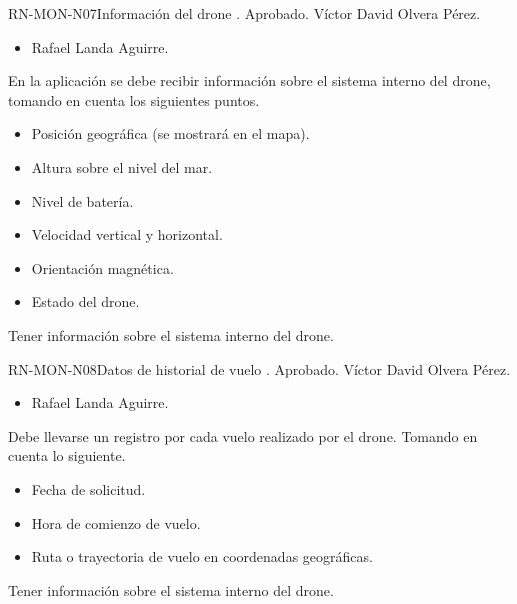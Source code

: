 %
\begin{BusinessRule}{RN-MON-N07}{Información del drone}
	{\bcIntegridad}
	{\btEnabler}
	{\blControlling}
	.
	\BRItem[Estado] Aprobado.
	 Víctor David Olvera Pérez.
	 \cdtEmpty
	\begin{itemize}
		\item Rafael Landa Aguirre.
	\end{itemize}
	\BRItem[Descripción] En la aplicación se debe recibir información sobre 
	el sistema interno del drone, tomando en cuenta los siguientes puntos.
		\begin{itemize}
			\item Posición geográfica (se mostrará en el mapa).
			\item Altura sobre el nivel del mar.
			\item Nivel de batería.
			\item Velocidad vertical y horizontal.
			\item Orientación magnética.
			\item Estado del drone.
		\end{itemize}
	\BRItem[Motivación] Tener información sobre el sistema interno del drone.
\end{BusinessRule}

%
\begin{BusinessRule}{RN-MON-N08}{Datos de historial de vuelo}
	{\bcIntegridad}
	{\btEnabler}
	{\blControlling}
	.
	\BRItem[Estado] Aprobado.
	 Víctor David Olvera Pérez.
	 \cdtEmpty
	\begin{itemize}
		\item Rafael Landa Aguirre.
	\end{itemize}
	\BRItem[Descripción] Debe llevarse un registro por cada vuelo realizado 
	por el drone. Tomando en cuenta lo siguiente.
	\begin{itemize}
		\item Fecha de solicitud.
		\item Hora de comienzo de vuelo.
		\item Ruta o trayectoria de vuelo en coordenadas geográficas.
	\end{itemize}
	\BRItem[Motivación] Tener información sobre el sistema interno del 
	drone.
\end{BusinessRule}

